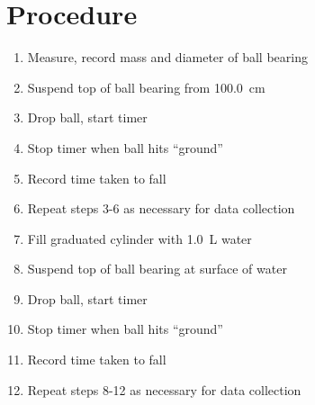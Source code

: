 \documentclass[a4paper]{article}
\begin{document}
    \section{Procedure}
        \begin{enumerate}
            \item Measure, record mass and diameter of ball bearing
            \item Suspend top of ball bearing from \SI{100.0}{\cm}
            \item Drop ball, start timer
            \item Stop timer when ball hits ``ground''
            \item Record time taken to fall
            \item Repeat steps 3-6 as necessary for data collection
            \item Fill graduated cylinder with \SI{1.0}{\L} water
            \item Suspend top of ball bearing at surface of water
            \item Drop ball, start timer
            \item Stop timer when ball hits ``ground''
            \item Record time taken to fall
            \item Repeat steps 8-12 as necessary for data collection
        \end{enumerate}
\end{document}
